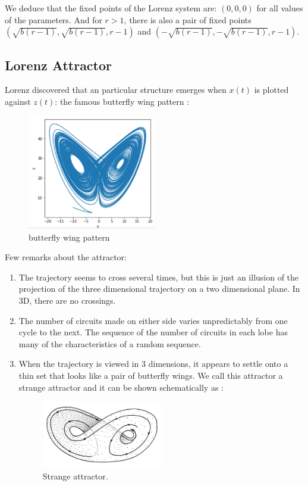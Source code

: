\documentclass[12pt]{article}
\begin{document}
	\noindent We deduce that the fixed points of the Lorenz system are: $(0,0,0)$ for all values of the parameters. And for $r>1$, there is also a pair of fixed points $(\sqrt{b(r-1)},\sqrt{b(r-1)},r-1)$ and $(-\sqrt{b(r-1)},-\sqrt{b(r-1)},r-1)$.
	
	\subsection{Lorenz Attractor}
	
	
	\noindent Lorenz discovered that an particular structure emerges when $x(t)$ is plotted against $z(t)$: the famous butterfly wing pattern :
	\begin{figure}
		\centering
		\includegraphics[width=0.5\textwidth]{"images/butterfly.jpg"}
		\caption{butterfly wing pattern}
		\label{but_wing}
	\end{figure}	
	\noindent Few remarks about the attractor:
	\begin{enumerate}[label=\textbullet]
		\item The trajectory seems to cross several times, but this is just an illusion of the projection of the three dimensional trajectory on a two dimensional plane. In 3D, there are no crossings.
		\item The number of circuits made on either side varies unpredictably from one cycle to the next. The sequence of the number of circuits in each lobe has many of the characteristics of a random sequence.
		\item When the trajectory is viewed in 3 dimensions, it appears to settle onto a thin set that looks like a pair of butterfly wings. We call this attractor a strange attractor and it can be shown schematically as :
		\begin{figure}
			\centering
			\includegraphics[width=0.5\textwidth]{"images/butterfly3D.jpg"}
			\caption{Strange attractor.}
		\end{figure}
	\end{enumerate}
	
\end{document}
